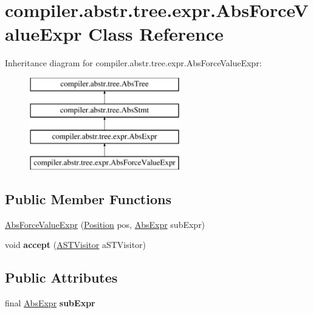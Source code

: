 \hypertarget{classcompiler_1_1abstr_1_1tree_1_1expr_1_1_abs_force_value_expr}{}\section{compiler.\+abstr.\+tree.\+expr.\+Abs\+Force\+Value\+Expr Class Reference}
\label{classcompiler_1_1abstr_1_1tree_1_1expr_1_1_abs_force_value_expr}
Inheritance diagram for compiler.\+abstr.\+tree.\+expr.\+Abs\+Force\+Value\+Expr\+:\begin{figure}[H]
\begin{center}
\leavevmode
\includegraphics[height=4.000000cm]{classcompiler_1_1abstr_1_1tree_1_1expr_1_1_abs_force_value_expr}
\end{center}
\end{figure}
\subsection*{Public Member Functions}
\begin{DoxyCompactItemize}
\item 
\hyperlink{classcompiler_1_1abstr_1_1tree_1_1expr_1_1_abs_force_value_expr_a00245c7f119734a374df1c722a68f325}{Abs\+Force\+Value\+Expr} (\hyperlink{classcompiler_1_1_position}{Position} pos, \hyperlink{classcompiler_1_1abstr_1_1tree_1_1expr_1_1_abs_expr}{Abs\+Expr} sub\+Expr)
\item 
\mbox{\label{classcompiler_1_1abstr_1_1tree_1_1expr_1_1_abs_force_value_expr_ac4fa9fee8fc6f1b61326c776e1c2d9ad}} 
void {\bfseries accept} (\hyperlink{interfacecompiler_1_1abstr_1_1_a_s_t_visitor}{A\+S\+T\+Visitor} a\+S\+T\+Visitor)
\end{DoxyCompactItemize}
\subsection*{Public Attributes}
\begin{DoxyCompactItemize}
\item 
\mbox{\label{classcompiler_1_1abstr_1_1tree_1_1expr_1_1_abs_force_value_expr_a900f9bd68d8dd1564e6ea5519596668b}} 
final \hyperlink{classcompiler_1_1abstr_1_1tree_1_1expr_1_1_abs_expr}{Abs\+Expr} {\bfseries sub\+Expr}
\end{DoxyCompactItemize}


